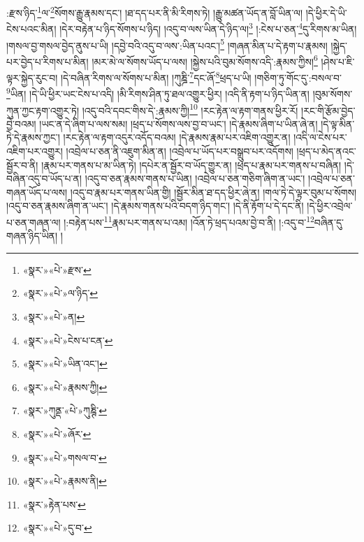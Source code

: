 :རྫས་ཉིད་\footnote{«སྣར་»«པེ་»རྫས་}ལ་\footnote{«སྣར་»«པེ་»ལ་ཉིད་}སོགས་རྒྱུ་རྣམས་དང་། །ཐ་དད་པར་ནི་མི་རིགས་ཏེ། །རྒྱུ་མཚན་ཡོད་ན་བློ་ཡིན་ལ། །དེ་ཕྱིར་དེ་ཡི་ངེས་པའང་མིན། །དེར་བརྟེན་པ་ཉིད་སོགས་པ་ཉིད། །འདུ་བ་ལས་ཡིན་དེ་ཉིད་ལ།\footnote{«སྣར་»«པེ་»ན།} །:ངེས་པ་ཅན་\footnote{«སྣར་»«པེ་»ངེས་པ་ངན་}དུ་རིགས་མ་ཡིན། །གསལ་བྱ་གསལ་བྱེད་ནུས་པ་ཡི། །དབྱེ་བའི་འདུ་བ་ལས་:ཡིན་པའང་།\footnote{«སྣར་»«པེ་»ཡིན་འང་།} །གཞན་མིན་པ་དེ་རྟག་པ་རྣམས། །སྐྱེད་པར་བྱེད་པ་རིགས་པ་མིན། །མར་མེ་ལ་སོགས་ཡོད་པ་ལས། །སྐྱེས་པའི་བུམ་སོགས་འདི་:རྣམས་ཀྱིས།\footnote{«སྣར་»«པེ་»རྣམས་ཀྱི།} །ཤེས་པ་ཇི་ལྟར་སྐྱེད་རུང་བ། །དེ་བཞིན་རིགས་ལ་སོགས་པ་མིན། །ཀུཎྜི་\footnote{«སྣར་»ཀུནྡ་«པེ་»ཀུཎྚི་}དང་ཞོ་\footnote{«སྣར་»«པེ་»ཞོར་}ཕྲད་པ་ཡི། །གཅིག་ཏུ་གོང་དུ་:བསལ་བ་\footnote{«སྣར་»«པེ་»གསལ་བ་}ཡིན། །དེ་ཡི་ཕྱིར་ཡང་ངེས་པ་འདི། །མི་རིགས་ཤིན་ཏུ་ཐལ་འགྱུར་ཕྱིར། །འདི་ནི་རྟག་པ་ཉིད་ཡིན་ན། །བུམ་སོགས་ཀུན་ཀྱང་རྟག་འགྱུར་ཏེ། །འདུ་བའི་དབང་གིས་དེ་:རྣམས་ཀྱི།\footnote{«སྣར་»«པེ་»རྣམས་ནི།} །རང་རྟེན་ལ་རྟག་གནས་ཕྱིར་རོ། །རང་གི་རྩོམ་བྱེད་བྱེ་བའམ། །ཡང་ན་དེ་ཞིག་པ་ལས་སམ། །ཕྲད་པ་སོགས་ལས་བྱ་བ་ཡང་། །དེ་རྣམས་ཞིག་པ་ཡིན་ཞེ་ན། །དེ་ལྟ་མིན་ཏེ་དེ་རྣམས་ཀྱང་། །རང་རྟེན་ལ་རྟག་འདུར་འདོད་བའམ། །དེ་རྣམས་རྣམ་པར་འཇིག་འགྱུར་ན། །འདི་ལ་ངེས་པར་འཇིག་པར་འགྱུར། །འབྲེལ་པ་ཅན་ནི་འཇུག་མིན་ན། །འབྲེལ་པ་ཡོད་པར་བསྒྲུབ་པར་འདོགས། །ཕྲད་པ་མེད་ནའང་སྦྱོར་བ་ནི། །རྣམ་པར་གནས་པ་མ་ཡིན་ཏེ། །དཔེར་ན་སྦྱོར་བ་ཡོད་གྱུར་ན། །ཕྲད་པ་རྣམ་པར་གནས་པ་བཞིན། །དེ་བཞིན་འདུ་བ་ཡོད་པ་ན། །འདུ་བ་ཅན་རྣམས་གནས་པ་ཡིན། །འབྲེལ་པ་ཅན་གཅིག་ཞིག་ན་ཡང་། །འབྲེལ་པ་ཅན་གཞན་ཡོད་པ་ལས། །འདུ་བ་རྣམ་པར་གནས་ཡིན་གྱི། །སྦྱོར་མིན་ཐ་དད་ཕྱིར་ཞེ་ན། །གལ་ཏེ་དེ་ལྟར་བུམ་པ་སོགས། །འདུ་བ་ཅན་རྣམས་ཞིག་ན་ཡང་། །དེ་རྣམས་གནས་པའི་བདག་ཉིད་གང་། །དེ་ནི་རྟོག་པ་དེ་དང་ནི། །དེ་ཕྱིར་འབྲེལ་པ་ཅན་གཞན་ལ། །:བརྟེན་པས་\footnote{«སྣར་»རྟེན་པས་}རྣམ་པར་གནས་པ་འམ། །འོན་ཏེ་ཕྲད་པའམ་བྱེ་བ་ནི། །:འདུ་བ་\footnote{«སྣར་»«པེ་»དུ་བ་}བཞིན་དུ་གཞན་ཉིད་ཡིན། །
